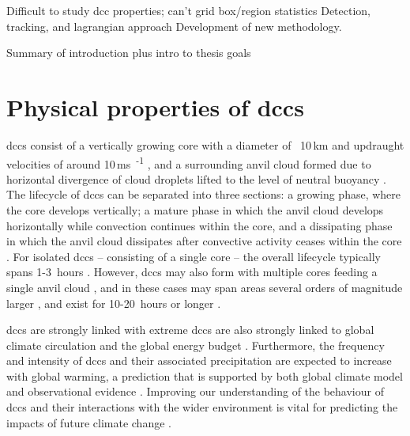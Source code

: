Difficult to study dcc properties; can't grid box/region statistics
Detection, tracking, and lagrangian approach
Development of new methodology.

Summary of introduction plus intro to thesis goals



\section{Physical properties of \acrshort{dcc}s}

\acrshort{dcc}s consist of a vertically growing core with a diameter of ~10\,\unit{km} and updraught velocities of around 10\,\unit{ms\textsuperscript{-1}} \citep{weisman_mesoscale_2015}, and a surrounding anvil cloud formed due to horizontal divergence of cloud droplets lifted to the level of neutral buoyancy \citep{houze_chapter_2014}.
The lifecycle of \acrshort{dcc}s can be separated into three sections: a growing phase, where the core develops vertically; a mature phase in which the anvil cloud develops horizontally while convection continues within the core, and a dissipating phase in which the anvil cloud dissipates after convective activity ceases within the core \citep{wall_life_2018}.
For isolated \acrshort{dcc}s -- consisting of a single core -- the overall lifecycle typically spans 1-3~hours \citep{chen_diurnal_1997}.
However, \acrshort{dcc}s may also form with multiple cores feeding a single anvil cloud \citep{roca_simple_2017}, and in these cases may span areas several orders of magnitude larger \citep{houze_mesoscale_2004}, and exist for 10-20~hours or longer \citep{chen_diurnal_1997}.

\acrshort{dcc}s are strongly linked with extreme  
\acrshort{dcc}s are also strongly linked to global climate circulation and the global energy budget \citep{houze_mesoscale_2004, fritsch_mesoscale_2001, johnson_mesoscale_2001}.
Furthermore, the frequency and intensity of \acrshort{dcc}s and their associated precipitation are expected to increase with global warming, a prediction that is supported by both global climate model \citep{allen_constraints_2002, trenberth_changing_2003, held_robust_2006, muller_energetic_2011, ogorman_energetic_2012, ogorman_precipitation_2015} and observational evidence \citep{tan_increases_2015, berg_strong_2013, aumann_increased_2018, houze_extreme_2019}.
Improving our understanding of the behaviour of \acrshort{dcc}s and their interactions with the wider environment is vital for predicting the impacts of future climate change \citep{westra_future_2014}.


